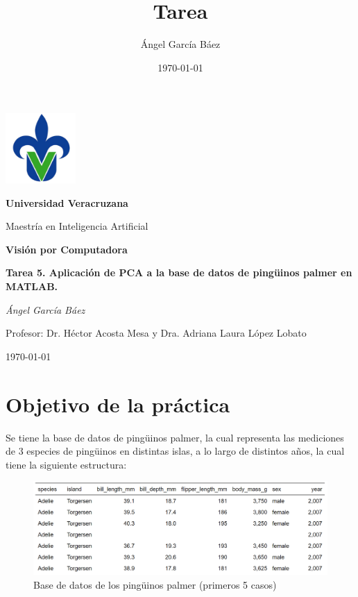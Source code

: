 \documentclass[11pt, letterpaper]{article}
\title{\bfseries Tarea}
\author{Ángel García Báez}
\date{\today}
\begin{document}
	
	\begin{titlepage}
		\centering
		\includegraphics[width=0.2\textwidth]{logo.png}\par
		\vspace{1cm}
		{\LARGE \bfseries Universidad Veracruzana \par}
		\vspace{1cm}
		{\Large Maestría en Inteligencia Artificial\par}
		\vspace{3cm}
		{\LARGE \bfseries Visión por Computadora \par}
		\vspace{1cm}
		{\Large \bfseries Tarea 5. Aplicación de PCA a la base de datos de pingüinos palmer en MATLAB. \par}
		\vfill
		{\Large \textit{Ángel García Báez}\par}
		\vspace{1cm}
		{\Large Profesor: Dr. Héctor Acosta Mesa y Dra. Adriana Laura López Lobato\par}
		\vfill
		{\Large \today \par}
	\end{titlepage}
	
	\newpage
	\tableofcontents
	\newpage
	
\section{Objetivo de la práctica}
	
Se tiene la base de datos de pingüinos palmer, la cual representa las mediciones de 3 especies de pingüinos en distintas islas, a lo largo de distintos años, la cual tiene la siguiente estructura:


\begin{figure}[h!]
	\centering
	\begin{minipage}{1\textwidth}
		\centering
		\includegraphics[width=\textwidth]{IMG/T1.png}
		\caption{Base de datos de los pingüinos palmer (primeros 5 casos)}
		\label{fig:f1}
	\end{minipage}\hfill
\end{figure}
\end{document}
